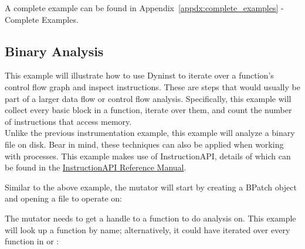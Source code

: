 A complete example can be found in Appendix~\ref{appdx:complete_examples} - Complete Examples.
 
\subsection{Binary Analysis}

This example will illustrate how to use Dyninst to iterate over a function’s control flow graph and inspect instructions.  These are steps that would usually be part of a larger data flow or control flow analysis.  Specifically, this example will collect every basic block in a function, iterate over them, and count the number of instructions that access memory.\\

Unlike the previous instrumentation example, this example will analyze a binary file on disk. Bear in mind, these techniques can also be applied when working with processes.  This example makes use of InstructionAPI, details of which can be found in the \underline{InstructionAPI Reference Manual}.

Similar to the above example, the mutator will start by creating a BPatch object and opening a file to operate on:

The mutator needs to get a handle to a function to do analysis on.  This example will look up a function by name; alternatively, it could have iterated over every function in \BPatchimage or \BPatchmodule:

